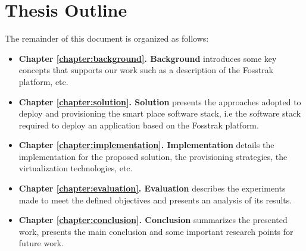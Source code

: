 \section{Thesis Outline}
\label{section:outline}
The remainder of this document is organized as follows:
\begin{itemize}
  \item \textbf{Chapter \ref{chapter:background}. Background} introduces some key concepts that supports
  our work such as a description of the Fosstrak platform, etc.
  \item \textbf{Chapter \ref{chapter:solution}. Solution} presents the approaches adopted to deploy
  and provisioning the smart place software stack, i.e the software stack required to deploy
  an application based on the Fosstrak platform.
  \item \textbf{Chapter \ref{chapter:implementation}. Implementation} details the implementation
  for the proposed solution, the provisioning strategies, the virtualization technologies, etc.
  \item \textbf{Chapter \ref{chapter:evaluation}. Evaluation} describes the experiments made to meet
  the defined objectives and presents an analysis of its results.
  \item \textbf{Chapter \ref{chapter:conclusion}. Conclusion} summarizes the presented work,
  presents the main conclusion and some important research points for future work.
\end{itemize}
